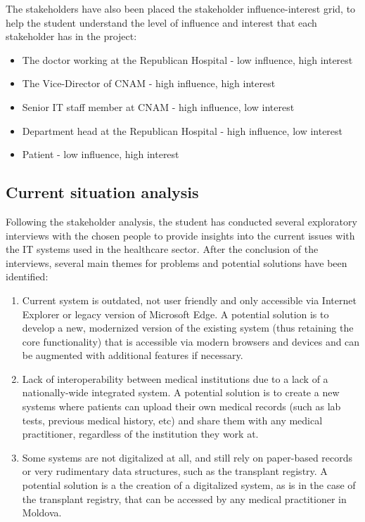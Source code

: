 The stakeholders have also been placed the stakeholder influence-interest grid, to help the student understand the level of influence and interest that each stakeholder has in the project:

\begin{itemize}
    \item The doctor working at the Republican Hospital - low influence, high interest
    \item The Vice-Director of CNAM - high influence, high interest
    \item Senior IT staff member at CNAM - high influence, low interest
    \item Department head at the Republican Hospital - high influence, low interest
    \item Patient - low influence, high interest
\end{itemize}

\subsection{Current situation analysis}

Following the stakeholder analysis, the student has conducted several exploratory interviews with the chosen people to provide insights into the current issues with the IT systems used in the healthcare sector. After the conclusion of the interviews, several main themes for problems and potential solutions have been identified:

\begin{enumerate}
    \item Current system is outdated, not user friendly and only accessible via Internet Explorer or legacy version of Microsoft Edge. A potential solution is to develop a new, modernized version of the existing system (thus retaining the core functionality) that is accessible via modern browsers and devices and can be augmented with additional features if necessary.
    \item Lack of interoperability between medical institutions due to a lack of a nationally-wide integrated system. A potential solution is to create a new systems where patients can upload their own medical records (such as lab tests, previous medical history, etc) and share them with any medical practitioner, regardless of the institution they work at. 
    \item Some systems are not digitalized at all, and still rely on paper-based records or very rudimentary data structures, such as the transplant registry. A potential solution is a the creation of a digitalized system, as is in the case of the transplant registry, that can be accessed by any medical practitioner in Moldova.
\end{enumerate}

